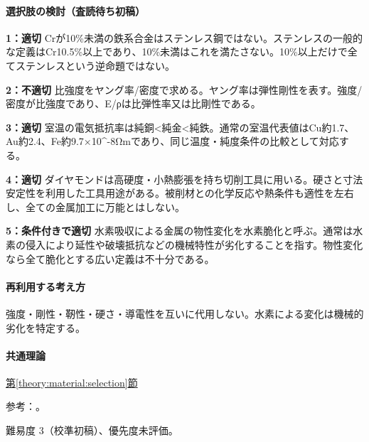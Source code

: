 \paragraph{選択肢の検討（査読待ち初稿）}\mbox{}\par

\noindent\textbf{1：適切} Crが10\%未満の鉄系合金はステンレス鋼ではない。ステンレスの一般的な定義はCr10.5\%以上であり、10\%未満はこれを満たさない。10\%以上だけで全てステンレスという逆命題ではない。\par

\noindent\textbf{2：不適切} 比強度をヤング率/密度で求める。ヤング率は弾性剛性を表す。強度/密度が比強度であり、E/ρは比弾性率又は比剛性である。\par

\noindent\textbf{3：適切} 室温の電気抵抗率は純銅<純金<純鉄。通常の室温代表値はCu約1.7、Au約2.4、Fe約9.7×10\textasciicircum{}-8Ωmであり、同じ温度・純度条件の比較として対応する。\par

\noindent\textbf{4：適切} ダイヤモンドは高硬度・小熱膨張を持ち切削工具に用いる。硬さと寸法安定性を利用した工具用途がある。被削材との化学反応や熱条件も適性を左右し、全ての金属加工に万能とはしない。\par

\noindent\textbf{5：条件付きで適切} 水素吸収による金属の物性変化を水素脆化と呼ぶ。通常は水素の侵入により延性や破壊抵抗などの機械特性が劣化することを指す。物性変化なら全て脆化とする広い定義は不十分である。\par

\paragraph{再利用する考え方} 強度・剛性・靭性・硬さ・導電性を互いに代用しない。水素による変化は機械的劣化を特定する。

\paragraph{共通理論} \hyperref[theory:material:selection]{第\ref*{theory:material:selection}節}

\par 参考：\cite{mit_material_elastic2000,stainless_definition2022,openstax_resistivity,nims_hydrogen2024,nims_diamond2007}。

\par 難易度 3（校準初稿）、優先度未評価。

